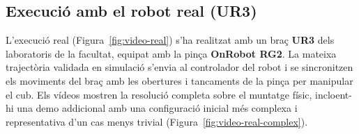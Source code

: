 \documentclass[12pt, a4paper]{article}
\begin{document}
\subsection{Execució amb el robot real (UR3)}

L'execució real (Figura~\ref{fig:video-real}) s'ha realitzat amb un braç
\textbf{UR3} dels laboratoris de la facultat, equipat amb la pinça
\textbf{OnRobot RG2}. La mateixa trajectòria validada en simulació s'envia al
controlador del robot i se sincronitzen els moviments del braç amb les
obertures i tancaments de la pinça per manipular el cub. Els vídeos mostren la
resolució completa sobre el muntatge físic, incloent-hi una demo addicional
amb una configuració inicial més complexa i representativa d'un cas menys
trivial (Figura~\ref{fig:video-real-complex}).
\end{document}
